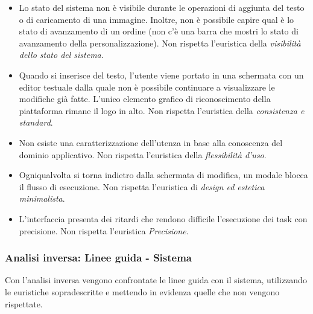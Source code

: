\documentclass[12pt,italian,]{report}
\begin{document}
\begin{itemize}
\item
  Lo stato del sistema non è visibile durante le operazioni di aggiunta
  del testo o di caricamento di una immagine. Inoltre, non è possibile
  capire qual è lo stato di avanzamento di un ordine (non c'è una barra
  che mostri lo stato di avanzamento della personalizzazione). Non
  rispetta l'euristica della \emph{visibilità dello stato del sistema}.
\item
  Quando si inserisce del testo, l'utente viene portato in una schermata
  con un editor testuale dalla quale non è possibile continuare a
  visualizzare le modifiche già fatte. L'unico elemento grafico di
  riconoscimento della piattaforma rimane il logo in alto. Non rispetta
  l'euristica della \emph{consistenza e standard}.
\item
  Non esiste una caratterizzazione dell'utenza in base alla conoscenza
  del dominio applicativo. Non rispetta l'euristica della
  \emph{flessibilità d'uso}.
\item
  Ogniqualvolta si torna indietro dalla schermata di modifica, un modale
  blocca il flusso di esecuzione. Non rispetta l'euristica di
  \emph{design ed estetica minimalista}.
\item
  L'interfaccia presenta dei ritardi che rendono difficile l'esecuzione
  dei task con precisione. Non rispetta l'euristica \emph{Precisione}.
\end{itemize}

\hypertarget{analisi-inversa-linee-guida---sistema}{%
\subsubsection{Analisi inversa: Linee guida -
Sistema}\label{analisi-inversa-linee-guida---sistema}}

Con l'analisi inversa vengono confrontate le linee guida con il sistema,
utilizzando le euristiche sopradescritte e mettendo in evidenza quelle
che non vengono rispettate.
\end{document}
